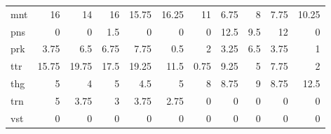 \begin{center}
\begin{tabular}{lrrrrrrrrrr}
mnt & 16 & 14 & 16 & 15.75 & 16.25 & 11 & 6.75 & 8 & 7.75 & 10.25\\
pns & 0 & 0 & 1.5 & 0 & 0 & 0 & 12.5 & 9.5 & 12 & 0\\
prk & 3.75 & 6.5 & 6.75 & 7.75 & 0.5 & 2 & 3.25 & 6.5 & 3.75 & 1\\
ttr & 15.75 & 19.75 & 17.5 & 19.25 & 11.5 & 0.75 & 9.25 & 5 & 7.75 & 2\\
thg & 5 & 4 & 5 & 4.5 & 5 & 8 & 8.75 & 9 & 8.75 & 12.5\\
trn & 5 & 3.75 & 3 & 3.75 & 2.75 & 0 & 0 & 0 & 0 & 0\\
vst & 0 & 0 & 0 & 0 & 0 & 0 & 0 & 0 & 0 & 0\\
\hline
\end{tabular}
\end{center}
